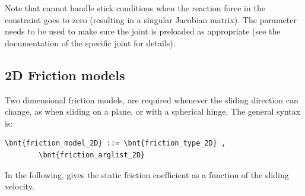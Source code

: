 \begin{enumerate}
    Note that 
    cannot handle stick conditions when the reaction force
    in the constraint goes to zero (resulting in a singular Jacobian matrix).
    The  parameter needs to be used to make sure
    the joint is preloaded as appropriate
    (see the documentation of the specific joint for details).
\end{enumerate}

\subsection{2D Friction models}
\label{sec:friction model 2D}
Two dimensional friction models,  are required whenever the sliding direction can change, as when sliding on a plane, or with a spherical hinge. The general syntax is:
\begin{Verbatim}[commandchars=\\\{\}]
    \bnt{friction_model_2D} ::= \bnt{friction_type_2D} ,
        \bnt{friction_arglist_2D}
\end{Verbatim}
In the following,  gives the static friction coefficient
as a function of the sliding velocity.

